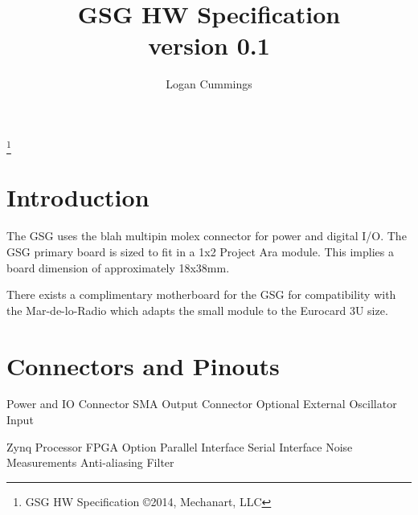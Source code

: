 \documentclass[letterpaper,12pt]{article}
\title{GSG HW Specification \\ \vspace{2 mm} {\large version 0.1}}
\author{Logan Cummings}
\begin{document}
\maketitle
\renewcommand*\footnoterule{}
\let\thefootnote\relax\footnote{GSG \hfill HW Specification  \hfill {\copyright{2014, Mechanart, LLC}}}
\newpage
\tableofcontents

\section{Introduction}

The GSG uses the blah multipin molex connector for power and digital I/O.
The GSG primary board is sized to fit in a 1x2 Project Ara module. This 
implies a board dimension of approximately 18x38mm. 

There exists a complimentary motherboard for the GSG for compatibility with 
the Mar-de-lo-Radio which adapts the small module to the Eurocard 3U size.

\section{Connectors and Pinouts}
Power and IO Connector
SMA Output Connector
Optional External Oscillator Input

Zynq Processor FPGA Option
Parallel Interface
Serial Interface 
Noise Measurements
Anti-aliasing Filter
\end{document}
